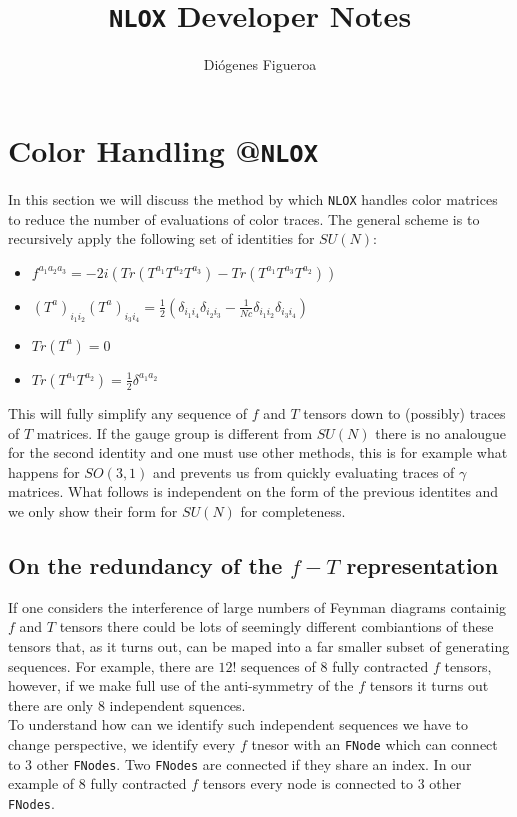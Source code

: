 \documentclass[a4paper]{article}
\title{\texttt{NLOX} Developer Notes}
\author{Diógenes Figueroa}
\begin{document}
\maketitle
\section{Color Handling @\texttt{NLOX}}
In this section we will discuss the method by which \texttt{NLOX} handles color matrices to reduce the number 
of evaluations of color traces. The general scheme is to recursively apply the following set of identities for 
$SU(N)$:

\begin{itemize}
 \item $f^{a_1a_2a_3} = -2i(Tr(T^{a_1} T^{a_2} T^{a_3})-Tr(T^{a_1} T^{a_3} T^{a_2}))$
 \item $(T^a)_{i_1i_2}(T^a)_{i_3i_4} = \frac{1}{2}\left(\delta_{i_1i_4}\delta_{i_2i_3} - \frac{1}{Nc}\delta_{i_1i_2}\delta_{i_3i_4}\right)$
 \item $Tr(T^a) = 0$
 \item $Tr(T^{a_1}T^{a_2})=\frac{1}{2}\delta^{a_1 a_2}$
\end{itemize}
This will fully simplify any sequence of $f$ and $T$ tensors down to (possibly) traces of $T$ matrices.
If the gauge group is different from $SU(N)$ there is no analougue for the second identity and one 
must use other methods, this is for example what happens for $SO(3,1)$ and prevents us from 
quickly evaluating traces of $\gamma$ matrices. What follows is independent on the form of the previous 
identites and we only show their form for $SU(N)$ for completeness.

\subsection{On the redundancy of the $f-T$ representation}
If one considers the interference of large numbers of Feynman diagrams containig $f$ and $T$ tensors there 
could be lots of seemingly different combiantions of these tensors that, as it turns out, can be maped into 
a far smaller subset of generating sequences. For example, there are $12!$ sequences of $8$ fully contracted $f$ tensors, however, if we make full use of the anti-symmetry of the $f$ tensors it turns out there are only $8$ independent squences.
\\ 

To understand how can we identify such independent sequences we have to change perspective, we identify every $f$ tnesor with an \texttt{FNode} which can connect to $3$ other \texttt{FNodes}.
Two \texttt{FNodes} are connected if they share an index. In our example of $8$ fully contracted $f$ tensors 
every node is connected to $3$ other \texttt{FNodes}.\\
\end{document}
